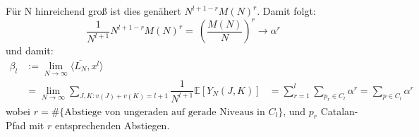 \documentclass[a4paper, 11pt]{scrreprt}
\newcommand{\EE}{\mathbb{E}}
\begin{document}
Für N hinreichend groß ist dies genähert \(N^{l+1-r}M(N)^r\). Damit folgt:
	\begin{equation}
		\frac {1}{N^{l+1}} N^{l+1-r}M(N)^r =~ \left( \dfrac{M(N)}{N}\right)^{r}\to \alpha^r
	\end{equation}
und damit:
	\begin{align*}
		\beta_l &:= \lim_{N\to\infty} \langle \overline{L_N}, x^l \rangle\\
		&= \lim_{N \to \infty} \sum_{J,K: v(J)+v(K) = l+1} \dfrac{1}{N^{l+1}}\EE[Y_N(J,K)]
		&= \sum_{r=1}^{l} \sum_{p_{r} \in C_{l}} \alpha^{r} = \sum_{p\in C_l} \alpha^r
	\end{align*}
wobei \(r=\#\{\text{Abstiege von ungeraden auf gerade Niveaus in } C_l\}\), und \(p_r\) Catalan-Pfad mit \(r\) entsprechenden Abstiegen.





\end{document}
